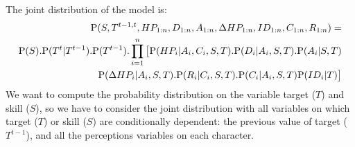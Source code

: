 The joint distribution of the model is: 
\begin{eqnarray}
\mathrm{P}(S, T^{t-1,t}, HP_{1:n}, D_{1:n}, A_{1:n}, \Delta HP_{1:n}, ID_{1:n}, C_{1:n}, R_{1:n}) = \\
\mathrm{P}(S).\mathrm{P}(T^t|T^{t-1}).\mathrm{P}(T^{t-1}).\prod_{i=1}^n \big[ \mathrm{P}(HP_i | A_i, C_i, S, T).\mathrm{P}(D_i | A_i, S, T).\mathrm{P}(A_i | S, T) \\
        \mathrm{P}(\Delta HP_i | A_i, S, T). \mathrm{P}(R_i | C_i, S, T). \mathrm{P}(C_i | A_i, S, T) \mathrm{P}(ID_i | T)\big]
\end{eqnarray}
We want to compute the probability distribution on the variable target ($T$) and skill ($S$), so we have to consider the joint distribution with all variables on which target ($T$) or skill ($S$) are conditionally dependent: the previous value of target ($T^{t-1}$), and all the perceptions variables on each character. 

